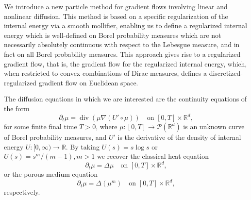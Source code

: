 \documentclass[11pt,leqno]{amsart}
\theoremstyle{definition}
\newcommand{\be}{\begin{equation}}
\newcommand{\ee}{\end{equation}}
\newcommand{\bes}{\begin{equation*}}
\newcommand{\ees}{\end{equation*}}
\newcommand{\R}{{\mathord{\mathbb R}}}
\newcommand{\grad}{\nabla}
\def\P{{\mathcal P}}
\DeclareMathOperator{\dive}{div}
\begin{document}
We introduce a new particle method for gradient flows involving linear and nonlinear diffusion. This method is based on a specific regularization of the internal energy via a smooth mollifier, enabling us to define a regularized internal energy which is well-defined on Borel probability measures which are not necessarily absolutely continuous with respect to the Lebesgue measure, and in fact on all Borel probability measures. This approach gives rise to a regularized gradient flow, that is, the gradient flow for the regularized internal energy, which, when restricted to convex combinations of Dirac measures, defines a discretized-regularized gradient flow on Euclidean space.

The diffusion equations in which we are interested are the continuity equations of the form
\be\label{eq:diffusion-general}
	\partial_t\mu = \dive (\mu \grad (U'\circ\mu)) \quad \mbox{on $[0,T]\times\R^d$},
\ee
for some finite final time $T>0$, where $\mu\colon [0,T] \to \P(\R^d)$ is an unknown curve of Borel probability measures, and $U'$ is the derivative of the density of internal energy $U \colon [0,\infty) \to \R$. By taking $U(s) = s\log s$ or $U(s) = s^m/(m-1), m>1$ we recover the classical heat equation
\bes
	\partial_t\mu = \Delta \mu \quad \mbox{on $[0,T]\times\R^d$},
\ees
or the porous medium equation
\bes
	\partial_t\mu = \Delta (\mu^m) \quad \mbox{on $[0,T]\times\R^d$},
\ees
respectively.
\end{document}
